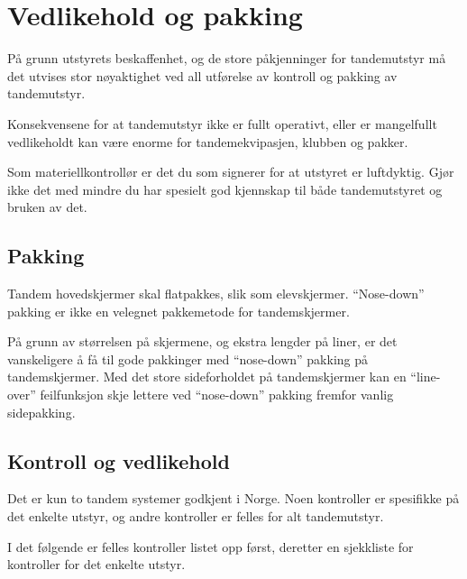 \section{Vedlikehold og pakking}
På grunn utstyrets beskaffenhet, og de store påkjenninger for tandemutstyr må det utvises stor nøyaktighet ved all utførelse av kontroll og pakking av tandemutstyr.

Konsekvensene for at tandemutstyr ikke er fullt operativt, eller er mangelfullt vedlikeholdt kan være enorme for tandemekvipasjen, klubben og pakker.

Som materiellkontrollør er det du som signerer for at utstyret er luftdyktig. Gjør ikke det med mindre du har spesielt god kjennskap til både tandemutstyret og bruken av det.

\subsection{Pakking}
Tandem hovedskjermer skal flatpakkes, slik som elevskjermer. ``Nose-down'' pakking er ikke en velegnet pakkemetode for tandemskjermer.

På grunn av størrelsen på skjermene, og ekstra lengder på liner, er det vanskeligere å få til gode pakkinger med ``nose-down'' pakking på tandemskjermer. Med det store sideforholdet på tandemskjermer kan en ``line-over'' feilfunksjon skje lettere ved ``nose-down'' pakking fremfor vanlig sidepakking.

\subsection{Kontroll og vedlikehold}
Det er kun to tandem systemer godkjent i Norge. Noen kontroller er spesifikke på det enkelte utstyr, og andre kontroller er felles for alt tandemutstyr.

I det følgende er felles kontroller listet opp først, deretter en sjekkliste for kontroller for det enkelte utstyr.

